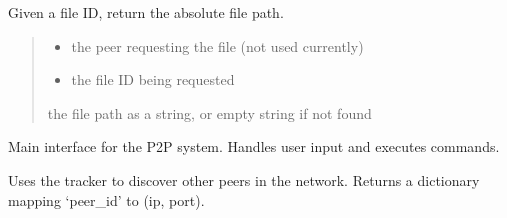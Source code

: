 \documentclass[letterpaper,10pt,oneside,english,openany]{sphinxmanual}
\begin{document}

\begin{fulllineitems}
\label{\detokenize{modules:p2p_command.get_index_path}}
\pysigstartsignatures
\pysiglinewithargsret
{}
{}
{}
\pysigstopsignatures
\sphinxAtStartPar
Given a file ID, return the absolute file path.
\begin{quote}\begin{description}
\begin{itemize}
\item {} 
\sphinxAtStartPar
{} \textendash{} the peer requesting the file (not used currently)

\item {} 
\sphinxAtStartPar
{} \textendash{} the file ID being requested

\end{itemize}

\sphinxAtStartPar
the file path as a string, or empty string if not found

\end{description}\end{quote}

\end{fulllineitems}


\begin{fulllineitems}
\label{\detokenize{modules:p2p_command.p2p_command_line}}
\pysigstartsignatures
\pysiglinewithargsret
{}
{\sphinxparamcomma {}}
{}
\pysigstopsignatures
\sphinxAtStartPar
Main interface for the P2P system.
Handles user input and executes commands.

\end{fulllineitems}


\begin{fulllineitems}
\label{\detokenize{modules:p2p_command.peer_discovery}}
\pysigstartsignatures
\pysiglinewithargsret
{}
{\sphinxparamcomma {}}
{}
\pysigstopsignatures
\sphinxAtStartPar
Uses the tracker to discover other peers in the network.
Returns a dictionary mapping ‘peer\_id’ to (ip, port).

\end{fulllineitems}
\end{document}
